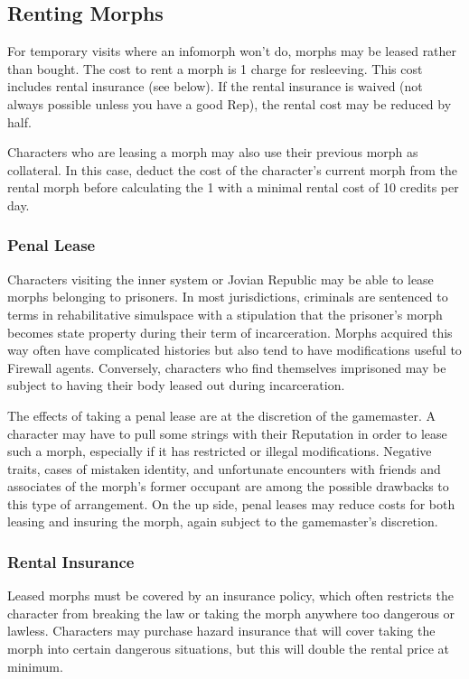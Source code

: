 \subsection{Renting Morphs}

For temporary visits where an infomorph won't do, 
morphs may be leased rather than bought. The cost 
to rent a morph is 1%
charge for resleeving. This cost includes rental insurance
(see below). If the rental insurance is waived
(not always possible unless you have a good Rep), the 
rental cost may be reduced by half.

Characters who are leasing a morph may also use 
their previous morph as collateral. In this case, deduct 
the cost of the character's current morph from the 
rental morph before calculating the 1%
with a minimal rental cost of 10 credits per day.

\subsubsection{Penal Lease}

Characters visiting the inner system or Jovian 
Republic may be able to lease morphs belonging 
to prisoners. In most jurisdictions, criminals are 
sentenced to terms in rehabilitative simulspace with 
a stipulation that the prisoner's morph becomes 
state property during their term of incarceration. 
Morphs acquired this way often have complicated 
histories but also tend to have modifications useful 
to Firewall agents. Conversely, characters who find 
themselves imprisoned may be subject to having 
their body leased out during incarceration.

The effects of taking a penal lease are at the discretion
of the gamemaster. A character may have
to pull some strings with their Reputation in order 
to lease such a morph, especially if it has restricted 
or illegal modifications. Negative traits, cases of 
mistaken identity, and unfortunate encounters with 
friends and associates of the morph's former occupant
are among the possible drawbacks to this
type of arrangement. On the up side, penal leases 
may reduce costs for both leasing and insuring the 
morph, again subject to the gamemaster's discretion.

\subsubsection{Rental Insurance}

Leased morphs must be covered by an insurance 
policy, which often restricts the character from 
breaking the law or taking the morph anywhere 
too dangerous or lawless. Characters may purchase 
hazard insurance that will cover taking the morph 
into certain dangerous situations, but this will 
double the rental price at minimum.

